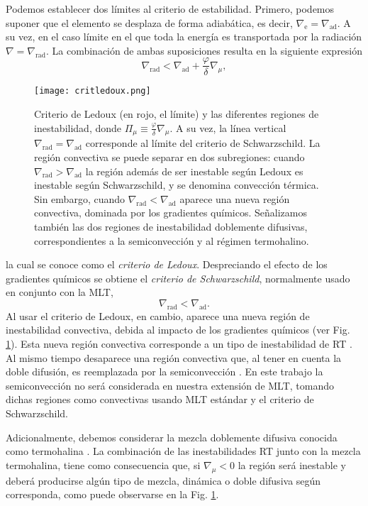 \documentclass[baaa]{baaa}
\begin{document}
Podemos establecer dos límites al criterio de estabilidad. Primero, podemos suponer que el elemento se desplaza de forma adiabática, es decir, $\nabla_\text{e}=\nabla_\text{ad}$. A su vez, en el caso límite en el que toda la energía es transportada por la radiación $\nabla=\nabla_\text{rad}$. La combinación de ambas suposiciones resulta en la siguiente expresión
\begin{equation}
    \nabla_\text{rad} < \nabla_\text{ad}  + \frac{\varphi}{\delta}\nabla_\mu,
\end{equation}
\begin{figure}[!t]
\centering
\texttt{[image: critledoux.png]}
\caption{Criterio de Ledoux (en rojo, el límite) y las diferentes regiones de inestabilidad, donde $\Pi_\mu\equiv\frac{\varphi}{\delta}\nabla_\mu$. A su vez, la línea vertical $\nabla_\text{rad}=\nabla_\text{ad}$ corresponde al límite del criterio de Schwarzschild. La región convectiva se puede separar en dos subregiones: cuando $\nabla_\text{rad}>\nabla_\text{ad}$ la región además de ser inestable según Ledoux es inestable según Schwarzschild, y se denomina convección térmica. Sin embargo, cuando $\nabla_\text{rad}<\nabla_\text{ad}$ aparece una nueva región convectiva, dominada por los gradientes químicos. Señalizamos también las dos regiones de inestabilidad doblemente difusivas, correspondientes a la semiconvección y al régimen termohalino.}
\label{FigLedoux}
\end{figure}
la cual se conoce como el \textit{criterio de Ledoux}. Despreciando el efecto de los gradientes químicos se obtiene el \textit{criterio de Schwarzschild}, normalmente usado en conjunto con la MLT,
\begin{equation}
    \nabla_\text{rad}<\nabla_\text{ad} .
\end{equation}
Al usar el criterio de Ledoux, en cambio, aparece una nueva región de inestabilidad convectiva, debida al impacto de los gradientes químicos (ver Fig. \ref{FigLedoux}). Esta nueva región convectiva corresponde a un tipo de inestabilidad de RT \citep{2020mdps.conf...13G}. Al mismo tiempo desaparece una región convectiva que, al tener en cuenta la doble difusión, es reemplazada por la semiconvección \citep{Kipphenhahn2013}. En este trabajo la semiconvección no será considerada en nuestra extensión de MLT, tomando dichas regiones como convectivas usando MLT estándar y el criterio de Schwarzschild.

Adicionalmente, debemos considerar la mezcla doblemente difusiva conocida como termohalina \citep{Kipphenhahn2013}. La combinación de las inestabilidades RT junto con la mezcla termohalina, tiene como consecuencia que, si $\nabla_\mu<0$ la región será inestable y deberá producirse algún tipo de mezcla, dinámica o doble difusiva según corresponda, como puede observarse en la Fig. \ref{FigLedoux}.
\end{document}
